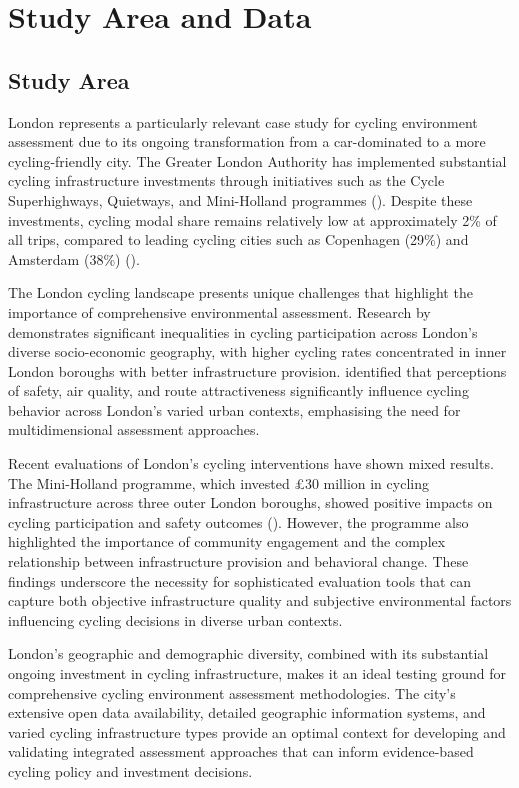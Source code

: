 \documentclass[
  12pt,
  oneside]{book}
\begin{document}
\chapter{Study Area and Data}\label{study-area-and-data}

\section{Study Area}\label{study-area}

London represents a particularly relevant case study for cycling environment assessment due to its ongoing transformation from a car-dominated to a more cycling-friendly city. The Greater London Authority has implemented substantial cycling infrastructure investments through initiatives such as the Cycle Superhighways, Quietways, and Mini-Holland programmes (\textcite{tfl_cycling_action_2018}). Despite these investments, cycling modal share remains relatively low at approximately 2\% of all trips, compared to leading cycling cities such as Copenhagen (29\%) and Amsterdam (38\%) (\textcite{aldred_impacts_2019}).

The London cycling landscape presents unique challenges that highlight the importance of comprehensive environmental assessment. Research by \textcite{goodman_inequalities_2018} demonstrates significant inequalities in cycling participation across London's diverse socio-economic geography, with higher cycling rates concentrated in inner London boroughs with better infrastructure provision. \textcite{aldred_investigating_2015} identified that perceptions of safety, air quality, and route attractiveness significantly influence cycling behavior across London's varied urban contexts, emphasising the need for multidimensional assessment approaches.

Recent evaluations of London's cycling interventions have shown mixed results. The Mini-Holland programme, which invested £30 million in cycling infrastructure across three outer London boroughs, showed positive impacts on cycling participation and safety outcomes (\textcite{aldred_impacts_2019}). However, the programme also highlighted the importance of community engagement and the complex relationship between infrastructure provision and behavioral change. These findings underscore the necessity for sophisticated evaluation tools that can capture both objective infrastructure quality and subjective environmental factors influencing cycling decisions in diverse urban contexts.

London's geographic and demographic diversity, combined with its substantial ongoing investment in cycling infrastructure, makes it an ideal testing ground for comprehensive cycling environment assessment methodologies. The city's extensive open data availability, detailed geographic information systems, and varied cycling infrastructure types provide an optimal context for developing and validating integrated assessment approaches that can inform evidence-based cycling policy and investment decisions.
\end{document}
